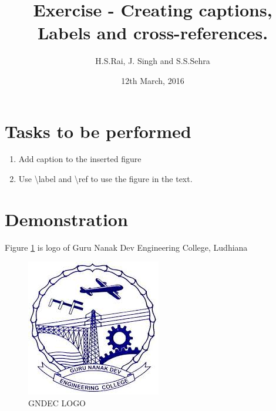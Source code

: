 \documentclass{article}
\title{Exercise - Creating captions, Labels and cross-references.}
\author{H.S.Rai, J. Singh and S.S.Sehra}
\date{12th March, 2016}
\begin{document}
	\maketitle	
	\section*{Tasks to be performed}
	\begin{enumerate}	
		\item Add caption to the inserted figure
		\item Use \textbackslash label and \textbackslash ref to use the figure in the text.
	\end{enumerate}
	\section*{Demonstration}
	 Figure \ref{fig:gnelogo} is logo of Guru Nanak Dev Engineering College, Ludhiana
\begin{figure}[h]
\centering
\includegraphics{../../images/gnelogo}
\caption{GNDEC LOGO}
\label{fig:gnelogo}
\end{figure}
\end{document}
